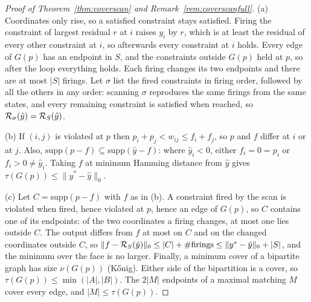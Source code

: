 \begin{proof}[Proof of Theorem~\ref{thm:coverscan} and Remark~\ref{rem:coverscanfull}]
(a) Coordinates only rise, so a satisfied constraint stays satisfied. Firing the constraint of
largest residual $r$ at $i$ raises $y_i$ by $r$, which is at least the residual of every other
constraint at $i$, so afterwards every constraint at $i$ holds. Every edge of $G(p)$ has an
endpoint in $S$, and the constraints outside $G(p)$ held at $p$, so after the loop everything
holds. Each firing changes its two endpoints and there are at most $|S|$ firings. Let $\sigma$ list
the fired constraints in firing order, followed by all the others in any order: scanning $\sigma$
reproduces the same firings from the same states, and every remaining constraint is satisfied
when reached, so $\mathcal{R}_\sigma(\hat y) = \mathcal{R}_S(\hat y)$.

(b) If $(i,j)$ is violated at $p$ then $p_i + p_j < w_{ij} \le f_i + f_j$, so $p$ and $f$ differ
at $i$ or at $j$. Also, $\mathrm{supp}(p - f) \subseteq \mathrm{supp}(\hat y - f)$: where
$\hat y_i < 0$, either $f_i = 0 = p_i$ or $f_i > 0 \ne \hat y_i$. Taking $f$ at minimum Hamming
distance from $\hat y$ gives $\tau(G(p)) \le \|y^* - \hat y\|_0$.

(c) Let $C = \mathrm{supp}(p - f)$ with $f$ as in (b). A constraint fired by the scan is violated
when fired, hence violated at $p$, hence an edge of $G(p)$, so $C$ contains one of its endpoints:
of the two coordinates a firing changes, at most one lies outside $C$. The output differs from
$f$ at most on $C$ and on the changed coordinates outside $C$, so
$\|f - \mathcal{R}_S(\hat y)\|_0 \le |C| + \#\mathrm{firings} \le \|y^* - \hat y\|_0 + |S|$, and the
minimum over the face is no larger. Finally, a minimum cover of a bipartite graph has size
$\nu(G(p))$ (K\H{o}nig). Either side of the bipartition is a cover, so
$\tau(G(p)) \le \min(|A|,|B|)$. The $2|M|$ endpoints of a maximal matching $M$ cover every edge,
and $|M| \le \tau(G(p))$.
\end{proof}

